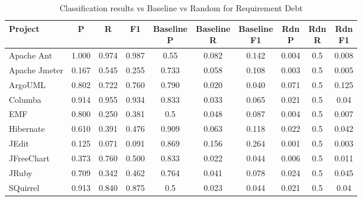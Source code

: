 \begin{table}[!hbt]
    \begin{center}
        \caption{Classification results vs Baseline vs Random for Requirement Debt}
        \label{tbl:classifier_results_vs_baseline_requirement}
        \begin{tabular}{l| c c c c c c c c c}
        \toprule
        \textbf{Project} & \textbf{P} & \textbf{R} & \textbf{F1} & \thead{Baseline\\P} & \thead{Baseline\\R} & \thead{Baseline\\F1} & \thead{Rdn\\P} & \thead{Rdn\\R} & \thead{Rdn\\F1} \\
        \midrule
        Apache Ant    & 1.000 &  0.974 &  0.987 & 0.55  & 0.082 & 0.142  & 0.004 &0.5 & 0.008  \\
        Apache Jmeter & 0.167 &  0.545 &  0.255 & 0.733 & 0.058 & 0.108  & 0.003 &0.5 & 0.005  \\
        ArgoUML       & 0.802 &  0.722 &  0.760 & 0.790 & 0.020 & 0.040  & 0.071 &0.5 & 0.125  \\
        Columba       & 0.914 &  0.955 &  0.934 & 0.833 & 0.033 & 0.065  & 0.021 &0.5 &  0.04  \\
        EMF           & 0.800 &  0.250 &  0.381 & 0.5   & 0.048 & 0.087  & 0.004 &0.5 & 0.007  \\
        Hibernate     & 0.610 &  0.391 &  0.476 & 0.909 & 0.063 & 0.118  & 0.022 &0.5 & 0.042  \\
        JEdit         & 0.125 &  0.071 &  0.091 & 0.869 & 0.156 & 0.264  & 0.001 &0.5 & 0.003  \\
        JFreeChart    & 0.373 &  0.760 &  0.500 & 0.833 & 0.022 & 0.044  & 0.006 &0.5 & 0.011  \\
        JRuby         & 0.709 &  0.342 &  0.462 & 0.764 & 0.041 & 0.078  & 0.024 &0.5 & 0.045  \\
        SQuirrel      & 0.913 &  0.840 &  0.875 & 0.5   & 0.023 & 0.044  & 0.021 &0.5 &  0.04  \\
        \bottomrule
        \end{tabular}
    \end{center}    
\end{table}



